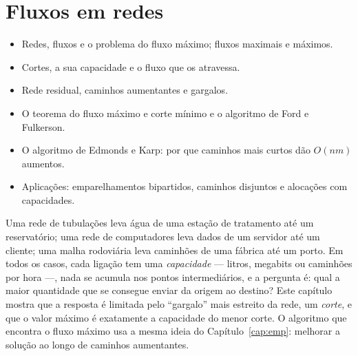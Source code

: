 \chapter{Fluxos em redes}\label{cap:fluxo}\label{sec:fluxos}
\begin{objetivos}
\begin{itemize}
  \item Redes, fluxos e o problema do fluxo máximo; fluxos maximais e máximos.
  \item Cortes, a sua capacidade e o fluxo que os atravessa.
  \item Rede residual, caminhos aumentantes e gargalos.
  \item O teorema do fluxo máximo e corte mínimo e o algoritmo de Ford e Fulkerson.
  \item O algoritmo de Edmonds e Karp: por que caminhos mais curtos dão $O(nm)$ aumentos.
  \item Aplicações: emparelhamentos bipartidos, caminhos disjuntos e alocações com capacidades.
\end{itemize}
\end{objetivos}

Uma rede de tubulações leva água de uma estação de tratamento até um reservatório; uma rede de computadores leva dados de um servidor até um cliente; uma malha rodoviária leva caminhões de uma fábrica até um porto. Em todos os casos, cada ligação tem uma \emph{capacidade} --- litros, megabits ou caminhões por hora ---, nada se acumula nos pontos intermediários, e a pergunta é: qual a maior quantidade que se consegue enviar da origem ao destino? Este capítulo mostra que a resposta é limitada pelo ``gargalo'' mais estreito da rede, um \emph{corte}, e que o valor máximo é exatamente a capacidade do menor corte. O algoritmo que encontra o fluxo máximo usa a mesma ideia do Capítulo~\ref{cap:emp}: melhorar a solução ao longo de caminhos aumentantes.

\newcommand{\redeslides}[1]{%
  \node[vtx, fill=Goldenrod!40, vs/.try] (s) at (0,0) {$s$};
  \node[vtx, va/.try] (a) at (1.5,-1.5) {$a$};
  \node[vtx, vb/.try] (b) at (3,0) {$b$};
  \node[vtx, vc/.try] (c) at (3,2) {$c$};
  \node[vtx, vd/.try] (d) at (4.9,-1.5) {$d$};
  \node[vtx, fill=Goldenrod!40, vt/.try] (t) at (6.2,0) {$t$};
  \foreach \uu/\ww/\cap/\idx/\curva/\pos in {s/c/4/0/rreta/0.45,s/b/2/1/rreta/0.5,s/a/3/2/rreta/0.5,a/b/3/3/rreta/0.5,b/c/1/4/rcurva/0.5,c/b/2/5/rcurva/0.5,b/d/4/6/rreta/0.5,d/a/3/7/rreta/0.5,c/t/3/8/rreta/0.5,d/t/5/9/rreta/0.5} {
    \if\relax\detokenize{#1}\relax \def\rotulo{\cap}%
    \else \pgfmathtruncatemacro{\valor}{{#1}[\idx]}\def\rotulo{\valor/\cap}\fi
    \draw[arco, e\uu\ww/.try] (\uu) to[\curva] node[peso, pos=\pos] {$\rotulo$} (\ww);}}

